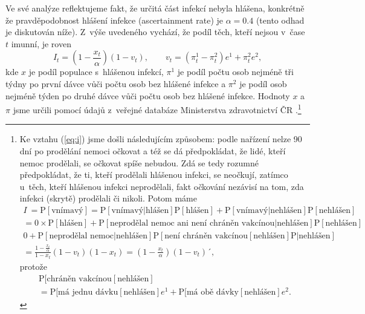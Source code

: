 Ve své analýze reflektujeme fakt, že určitá část infekcí nebyla
hlášena, konkrétně že pravděpodobnost hlášení infekce (ascertainment
rate) je $\alpha=0.4$ (tento odhad je diskutován níže). Z~výše uvedeného vychází,
že podíl těch, kteří nejsou v~čase $t$ imunní, je roven
\begin{equation}
I_{t}=\left(1-\frac{x_{t}}{\alpha}\right)\left(1-v_{t}\right),\qquad v_{t}=(\pi_{t}^{1}-\pi_{t}^{2})e^{1}+\pi_{t}^{2}e^{2},\label{eq:i}
\end{equation}
kde $x$ je podíl populace s~hlášenou infekcí, $\pi^{1}$ je podíl počtu osob nejméně tři týdny po první dávce vůči počtu osob bez hlášené infekce a $\pi^{2}$ je podíl osob
nejméně týden po druhé dávce vůči počtu osob bez hlášené infekce. Hodnoty $x$ a $\pi$ jsme určili pomocí údajů z~veřejné databáze Ministerstva
zdravotnictví ČR \cite{mzcrdata}.\footnote{Ke vztahu (\ref{eq:i}) jsme došli následujícím způsobem: podle nařízení \cite{covidportalspec} nelze 90 dní po prodělání nemoci očkovat a též se dá předpokládat, že lidé, kteří nemoc prodělali, se očkovat spíše nebudou. Zdá se tedy rozumné předpokládat, že ti, kteří prodělali hlášenou infekci, se neočkují, zatímco u~těch, kteří hlášenou infekci neprodělali, fakt očkování nezávisí na tom, zda infekci (skrytě) prodělali či nikoli. Potom máme 
\begin{multline*}
I~= \mathrm{P}[\text{vnímavý}]= \mathrm{P}[\text{vnímavý}|\text{hlášen}]\mathrm{P}[\text{hlášen}]
+\mathrm{P}[\text{vnímavý}|\text{nehlášen}]\mathrm{P}[\text{nehlášen}]
\\
= 0 \times \mathrm{P}[\text{hlášen}] 
+ \mathrm{P}[\text{neprodělal nemoc ani není chráněn vakcínou}|\text{nehlášen}]\mathrm{P}[\text{nehlášen}]
\\
0+\mathrm{P}[\text{neprodělal nemoc}|\text{nehlášen}]\mathrm{P}[\text{není chráněn vakcínou}[\text{nehlášen}]\mathrm{P}|\text{nehlášen}]
\\
= \frac{1-\frac{x_{t}}{\alpha}}{1-x_t}\left(1-v_{t}\right)(1-x_t)=\left(1-\frac{x_{t}}{\alpha}\right)\left(1-v_{t}\right)´,
\end{multline*}
protože
\begin{multline*}
\mathrm{P}[\text{chráněn vakcínou}[\text{nehlášen}]\\=\mathrm{P}[\text{má jednu dávku}[\text{nehlášen}]e^1+\mathrm{P}[\text{má obě dávky}[\text{nehlášen}] e^2.
\end{multline*}
}

